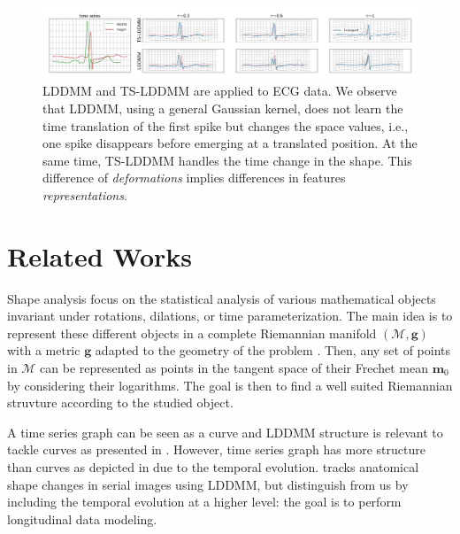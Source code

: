 \begin{figure}[t]
  \centering
  \includegraphics[width=\linewidth]{"./pictures/transport.jpeg"}
  
  \caption{LDDMM and TS-LDDMM are applied to ECG data.
  We observe that LDDMM, using a general Gaussian kernel, does not learn the time translation of the first spike but changes the space values, i.e., one spike disappears before emerging at a translated position. At the same time, TS-LDDMM handles the time change in the shape.
  This difference of \textit{deformations} implies differences in features \textit{representations}.   }
  \label{fig:transport}
  
\end{figure}

\section{Related Works}
Shape analysis focus on the statistical analysis of various mathematical objects invariant under rotations, dilations, or time parameterization.
 The main idea is to represent these different objects in a complete Riemannian manifold $(\mathcal{M},\mathbf{g})$ with a metric $\mathbf{g}$ adapted to the geometry of the problem \cite{miller2006geodesic}.
 Then, any set of points in $\mathcal{M}$ can be represented as points in the tangent space of their Frechet mean $\mathbf{m}_0$ \cite{pal2017riemannian,le2001locating} by considering their logarithms.
 The goal is then to find a well suited Riemannian struvture according to the studied object.

 A time series graph can be seen as a curve and LDDMM structure is relevant to tackle curves as presented in \cite{glaunes2008large}. %
  However, time series graph has more structure than curves as depicted in  due to the temporal evolution. 
  \cite{qiu2009time} tracks anatomical shape changes in serial images using LDDMM, but distinguish from us by including the temporal evolution at a higher level: the goal is to perform longitudinal data modeling.


